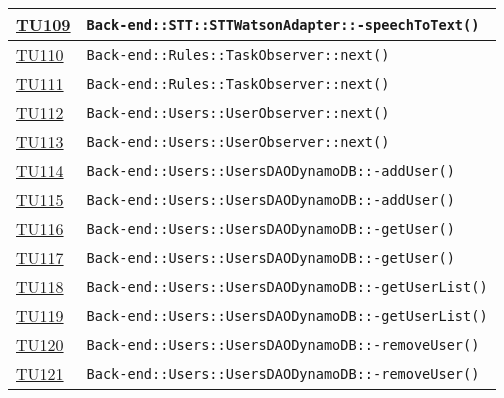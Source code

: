 \begin{longtable}{|>{\centering}m{1cm}|m{12cm}<{\centering}|}
\hyperlink{TU109}{TU109} & \texttt{Back-end::STT::STTWatsonAdapter::-\linebreak speechToText()}\\ \hline

\hyperlink{TU110}{TU110} & \texttt{Back-end::Rules::TaskObserver::next()}\\ \hline

\hyperlink{TU111}{TU111} & \texttt{Back-end::Rules::TaskObserver::next()}\\ \hline

\hyperlink{TU112}{TU112} & \texttt{Back-end::Users::UserObserver::next()}\\ \hline

\hyperlink{TU113}{TU113} & \texttt{Back-end::Users::UserObserver::next()}\\ \hline

\hyperlink{TU114}{TU114} & \texttt{Back-end::Users::UsersDAODynamoDB::-\linebreak addUser()}\\ \hline

\hyperlink{TU115}{TU115} & \texttt{Back-end::Users::UsersDAODynamoDB::-\linebreak addUser()}\\ \hline

\hyperlink{TU116}{TU116} & \texttt{Back-end::Users::UsersDAODynamoDB::-\linebreak getUser()}\\ \hline

\hyperlink{TU117}{TU117} & \texttt{Back-end::Users::UsersDAODynamoDB::-\linebreak getUser()}\\ \hline

\hyperlink{TU118}{TU118} & \texttt{Back-end::Users::UsersDAODynamoDB::-\linebreak getUserList()}\\ \hline

\hyperlink{TU119}{TU119} & \texttt{Back-end::Users::UsersDAODynamoDB::-\linebreak getUserList()}\\ \hline

\hyperlink{TU120}{TU120} & \texttt{Back-end::Users::UsersDAODynamoDB::-\linebreak removeUser()}\\ \hline

\hyperlink{TU121}{TU121} & \texttt{Back-end::Users::UsersDAODynamoDB::-\linebreak removeUser()}\\ \hline


\end{longtable}
